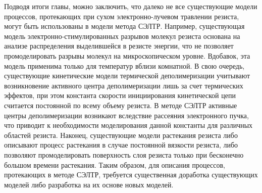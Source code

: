 Подводя итоги главы, можно заключить, что далеко не все существующие модели процессов, протекающих при сухом электронно-лучевом травлении резиста, могут быть использованы в модели метода СЭЛТР.
Например, существующая модель электронно-стимулированных разрывов молекул резиста основана на анализе распределения выделившейся в резисте энергии, что не позволяет промоделировать разрывы молекул на микроскопическом уровне.
Вдобавок, эта модель применима только для температур вблизи комнатной.
В свою очередь, существующие кинетические модели термической деполимеризации учитывают возникновение активного центра деполимеризации лишь за счет термических эффектов, при этом константа скорости инициирования кинетической цепи считается постоянной по всему объему резиста.
В методе СЭЛТР активные центры деполимеризации возникают вследствие рассеяния электронного пучка, что приводит к необходимости моделирования данной константы для различных областей резиста.
Наконец, существующие модели растекания резиста либо описывают процесс растекания в случае постоянной вязкости резиста, либо позволяют промоделировать поверхность слоя резиста только при бесконечно большом времени растекания.
Таким образом, для описания процессов, протекающих в методе СЭЛТР, требуется существенная доработка существующих моделей либо разработка на их основе новых моделей.
